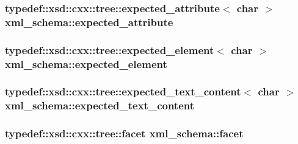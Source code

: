 \subsubsection[{\texorpdfstring{expected\+\_\+attribute}{expected_attribute}}]{\setlength{\rightskip}{0pt plus 5cm}typedef\+::xsd\+::cxx\+::tree\+::expected\+\_\+attribute$<$ char $>$ {\bf xml\+\_\+schema\+::expected\+\_\+attribute}}\hypertarget{namespacexml__schema_af16d098ecb2b5ba96a0734aa34bd8a5b}{}\label{namespacexml__schema_af16d098ecb2b5ba96a0734aa34bd8a5b}
\subsubsection[{\texorpdfstring{expected\+\_\+element}{expected_element}}]{\setlength{\rightskip}{0pt plus 5cm}typedef\+::xsd\+::cxx\+::tree\+::expected\+\_\+element$<$ char $>$ {\bf xml\+\_\+schema\+::expected\+\_\+element}}\hypertarget{namespacexml__schema_a8deca57d1e322d97eea32518a7237a49}{}\label{namespacexml__schema_a8deca57d1e322d97eea32518a7237a49}
\subsubsection[{\texorpdfstring{expected\+\_\+text\+\_\+content}{expected_text_content}}]{\setlength{\rightskip}{0pt plus 5cm}typedef\+::xsd\+::cxx\+::tree\+::expected\+\_\+text\+\_\+content$<$ char $>$ {\bf xml\+\_\+schema\+::expected\+\_\+text\+\_\+content}}\hypertarget{namespacexml__schema_ad0938777db5685ea04372a964518e87b}{}\label{namespacexml__schema_ad0938777db5685ea04372a964518e87b}
\subsubsection[{\texorpdfstring{facet}{facet}}]{\setlength{\rightskip}{0pt plus 5cm}typedef\+::xsd\+::cxx\+::tree\+::facet {\bf xml\+\_\+schema\+::facet}}\hypertarget{namespacexml__schema_a93c13629796b43b1cc518145be3f5390}{}\label{namespacexml__schema_a93c13629796b43b1cc518145be3f5390}
